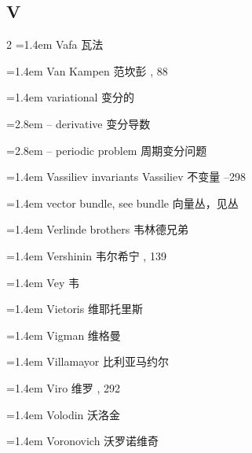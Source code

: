 \subsection*{V}
\small
\begin{multicols}{2}
\noindent\hangindent=1.4em Vafa \quad 瓦法 \par
\noindent\hangindent=1.4em Van Kampen \quad 范坎彭 , 88\par
\noindent\hangindent=1.4em variational \quad 变分的 \quad\par
\noindent\hangindent=2.8em -- derivative \quad 变分导数 \par
\noindent\hangindent=2.8em -- periodic problem \quad 周期变分问题 \par
\noindent\hangindent=1.4em Vassiliev invariants \quad Vassiliev 不变量 --298\par
\noindent\hangindent=1.4em vector bundle, see bundle \quad 向量丛，见丛 \quad\par
\noindent\hangindent=1.4em Verlinde brothers \quad 韦林德兄弟 \par
\noindent\hangindent=1.4em Vershinin \quad 韦尔希宁 , 139\par
\noindent\hangindent=1.4em Vey \quad 韦 \par
\noindent\hangindent=1.4em Vietoris \quad 维耶托里斯 \par
\noindent\hangindent=1.4em Vigman \quad 维格曼 \par
\noindent\hangindent=1.4em Villamayor \quad 比利亚马约尔 \par
\noindent\hangindent=1.4em Viro \quad 维罗 , 292\par
\noindent\hangindent=1.4em Volodin \quad 沃洛金 \par
\noindent\hangindent=1.4em Voronovich \quad 沃罗诺维奇 \par
\end{multicols}

